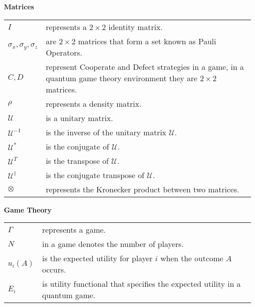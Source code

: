 \textbf{Matrices}

\renewcommand*{\arraystretch}{1.4}
\begin{longtable}[l]{p{50pt} p{300pt}}

$I$ 
&
represents a $2 \times 2$ identity matrix.
\\
$\sigma_{x}, \sigma_{y}, \sigma_{z}$
&
 are $2 \times 2$ matrices that form a set known as Pauli Operators.
\\
$C, D$
&
 represent Cooperate and Defect strategies in a game, in a quantum game theory environment they are $2 \times 2$ matrices.
\\
$\rho$
&
 represents a density matrix.
\\
$\mathcal{U}$
&
 is a unitary matrix.
\\
$\mathcal{U}^{-1}$
& is the inverse of the unitary matrix $\mathcal{U}$.
\\
$\mathcal{U}^{*}$
&
 is the conjugate of $\mathcal{U}$.
\\
$\mathcal{U}^{T}$
&
 is the transpose of $\mathcal{U}$.
\\
$\mathcal{U}^{\dagger}$
&
 is the conjugate transpose of $\mathcal{U}$.
\\
$\otimes$ &
 represents the Kronecker product between two matrices.
\\
\end{longtable}

\textbf{Game Theory}
\begin{longtable}[l]{p{50pt} p{300pt}}

$\Gamma$ &
 represents a game.
\\
$N$
&
 in a game denotes the number of players.
\\
$u_{i}(A)$ &
 is the expected utility for player $i$ when the outcome $A$ occurs.
\\
$E_{i}$
& is utility functional that specifies the expected utility in a quantum game.
\\
\end{longtable}
\clearpage
\thispagestyle{empty}

\cleardoublepage
